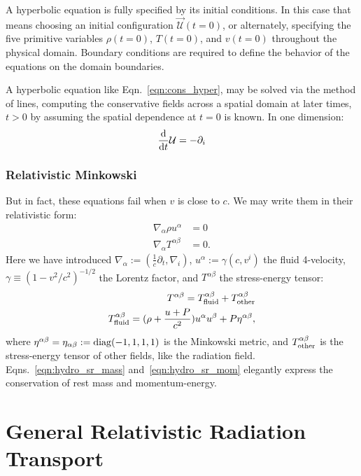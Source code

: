 A hyperbolic equation is fully specified by its initial conditions. In this case
that means choosing an initial configuration $\vec{\mathcal{U}}(t=0)$,
or alternately, specifying the five primitive variables
$\rho(t=0)$, $T(t=0)$, and $v(t=0)$ throughout the physical domain.
Boundary conditions are required to define the behavior of the equations on
the domain boundaries.

A hyperbolic equation like Eqn.~\ref{eqn:cons_hyper}, may be solved via the
method of lines, computing the conservative fields across a spatial domain at
later times, $t>0$ by assuming the spatial dependence at $t=0$ is known. In
one dimension:
\begin{equation}
  \frac{\mathrm{d}}{\mathrm{d} t} \mathcal{U} = -\partial_i
\end{equation}

\subsubsection{Relativistic Minkowski}
But in fact, these equations fail when $v$ is close to $c$.
We may write them in their relativistic form:
\begin{align}
  \label{eqn:hydro_sr_mass}
  \nabla_\alpha \rho u^\alpha &= 0 \\
  \label{eqn:hydro_sr_mom}
  \nabla_\alpha T^{\alpha \beta} &= 0.
\end{align}
Here we have introduced $\nabla_\alpha:=(\frac{1}{c}\partial_t,\nabla_i)$,
$u^\alpha:=\gamma(c,v^i)$ the fluid 4-velocity,
$\gamma\equiv(1-v^2/c^2)^{-1/2}$ the Lorentz factor, and
$T^{\alpha\beta}$ the stress-energy tensor:
\begin{eqnarray}
  \label{eqn:se_tensor}
  T^{\alpha\beta} = T_{\rm fluid}^{\alpha\beta} + T_{\rm other}^{\alpha\beta} \\
  T_{\rm fluid}^{\alpha\beta} = (\rho+\frac{u+P}{c^2})u^\alpha u^\beta+P\eta^{\alpha\beta}, \\
\end{eqnarray}
where $\eta^{\alpha\beta}=\eta_{\alpha\beta}:={\rm diag}(-1,1,1,1)$ is the
Minkowski metric, and
$T_{\rm other}^{\alpha\beta}$ is the stress-energy tensor of other fields, like
the radiation field.
Eqns.~\ref{eqn:hydro_sr_mass} and~\ref{eqn:hydro_sr_mom} elegantly express the
conservation of rest mass and momentum-energy.

\section{General Relativistic Radiation Transport}
\label{sec:rad_transport}

